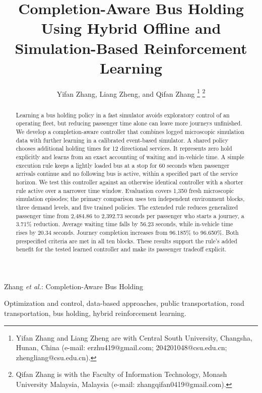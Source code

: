 \documentclass[letterpaper,journal]{IEEEtran}
\begin{document}
\title{Completion-Aware Bus Holding Using Hybrid Offline and Simulation-Based Reinforcement Learning}
\author{Yifan Zhang, Liang Zheng, and Qifan Zhang%
\thanks{Yifan Zhang and Liang Zheng are with Central South University, Changsha, Hunan, China (e-mail: erzhu419@gmail.com; 204201048@csu.edu.cn; zhengliang@csu.edu.cn).}%
\thanks{Qifan Zhang is with the Faculty of Information Technology, Monash University Malaysia, Malaysia (e-mail: zhangqifan0419@gmail.com).}}
%
{Zhang \MakeLowercase{\textit{et al.}}: Completion-Aware Bus Holding}
\maketitle

\begin{abstract}
Learning a bus holding policy in a fast simulator avoids exploratory control of an operating fleet, but reducing passenger time alone can leave more journeys unfinished. We develop a completion-aware controller that combines logged microscopic simulation data with further learning in a calibrated event-based simulator. A shared policy chooses additional holding times for 12 directional services. It represents zero hold explicitly and learns from an exact accounting of waiting and in-vehicle time. A simple execution rule keeps a lightly loaded bus at a stop for 60 seconds when passenger arrivals continue and no following bus is active, within a specified part of the service horizon. We test this controller against an otherwise identical controller with a shorter rule active over a narrower time window. Evaluation covers 1,350 fresh microscopic simulation episodes; the primary comparison uses ten independent environment blocks, three demand levels, and five trained policies. The extended rule reduces generalized passenger time from 2,484.86 to 2,392.73 seconds per passenger who starts a journey, a 3.71\% reduction. Average waiting time falls by 56.23 seconds, while in-vehicle time rises by 20.34 seconds. Journey completion increases from 96.185\% to 96.650\%. Both prespecified criteria are met in all ten blocks. These results support the rule's added benefit for the tested learned controller and make its passenger tradeoff explicit.
\end{abstract}
\begin{IEEEkeywords}
Optimization and control, data-based approaches, public transportation, road transportation, bus holding, hybrid reinforcement learning.
\end{IEEEkeywords}
\end{document}
